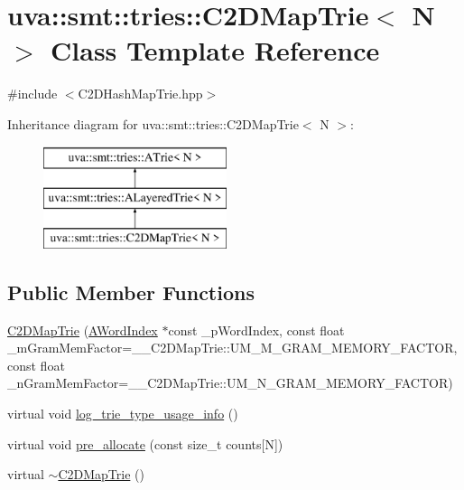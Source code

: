 \hypertarget{classuva_1_1smt_1_1tries_1_1_c2_d_map_trie}{}\section{uva\+:\+:smt\+:\+:tries\+:\+:C2\+D\+Map\+Trie$<$ N $>$ Class Template Reference}
\label{classuva_1_1smt_1_1tries_1_1_c2_d_map_trie}


{\ttfamily \#include $<$C2\+D\+Hash\+Map\+Trie.\+hpp$>$}

Inheritance diagram for uva\+:\+:smt\+:\+:tries\+:\+:C2\+D\+Map\+Trie$<$ N $>$\+:\begin{figure}[H]
\begin{center}
\leavevmode
\includegraphics[height=3.000000cm]{classuva_1_1smt_1_1tries_1_1_c2_d_map_trie}
\end{center}
\end{figure}
\subsection*{Public Member Functions}
\begin{DoxyCompactItemize}
\item 
\hyperlink{classuva_1_1smt_1_1tries_1_1_c2_d_map_trie_af38b3ad7ffd886314b07e820535da51c}{C2\+D\+Map\+Trie} (\hyperlink{classuva_1_1smt_1_1tries_1_1dictionary_1_1_a_word_index}{A\+Word\+Index} $\ast$const \+\_\+p\+Word\+Index, const float \+\_\+m\+Gram\+Mem\+Factor=\+\_\+\+\_\+\+C2\+D\+Map\+Trie\+::\+U\+M\+\_\+\+M\+\_\+\+G\+R\+A\+M\+\_\+\+M\+E\+M\+O\+R\+Y\+\_\+\+F\+A\+C\+T\+O\+R, const float \+\_\+n\+Gram\+Mem\+Factor=\+\_\+\+\_\+\+C2\+D\+Map\+Trie\+::\+U\+M\+\_\+\+N\+\_\+\+G\+R\+A\+M\+\_\+\+M\+E\+M\+O\+R\+Y\+\_\+\+F\+A\+C\+T\+O\+R)
\item 
virtual void \hyperlink{classuva_1_1smt_1_1tries_1_1_c2_d_map_trie_aaba97e128f3129776ca46e75f5c005e1}{log\+\_\+trie\+\_\+type\+\_\+usage\+\_\+info} ()
\item 
virtual void \hyperlink{classuva_1_1smt_1_1tries_1_1_c2_d_map_trie_a3de994ad435e17c75f3bcd1f7c511870}{pre\+\_\+allocate} (const size\+\_\+t counts\mbox{[}N\mbox{]})
\item 
virtual \hyperlink{classuva_1_1smt_1_1tries_1_1_c2_d_map_trie_ac80d7c29acb9353890d1644113421d2e}{$\sim$\+C2\+D\+Map\+Trie} ()
\end{DoxyCompactItemize}
